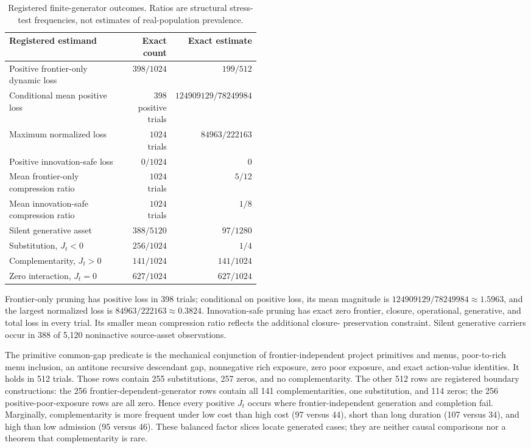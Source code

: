 \begin{table}[htbp]
  \centering
  \small
  \begin{tabular}{@{}p{0.48\linewidth}rr@{}}
    \toprule
    Registered estimand & Exact count & Exact estimate \\
    \midrule
    Positive frontier-only dynamic loss
      & \(398/1024\) & \(199/512\) \\
    Conditional mean positive loss
      & \(398\) positive trials & \(124909129/78249984\) \\
    Maximum normalized loss
      & \(1024\) trials & \(84963/222163\) \\
    Positive innovation-safe loss
      & \(0/1024\) & \(0\) \\
    Mean frontier-only compression ratio
      & \(1024\) trials & \(5/12\) \\
    Mean innovation-safe compression ratio
      & \(1024\) trials & \(1/8\) \\
    Silent generative asset
      & \(388/5120\) & \(97/1280\) \\
    Substitution, \(J_t<0\)
      & \(256/1024\) & \(1/4\) \\
    Complementarity, \(J_t>0\)
      & \(141/1024\) & \(141/1024\) \\
    Zero interaction, \(J_t=0\)
      & \(627/1024\) & \(627/1024\) \\
    \bottomrule
  \end{tabular}
  \caption{Registered finite-generator outcomes.  Ratios are structural
  stress-test frequencies, not estimates of real-population prevalence.}
  \label{tab:supp-randomized-library-v2}
\end{table}

Frontier-only pruning has positive loss in 398 trials; conditional on positive
loss, its mean magnitude is
\(124909129/78249984\approx1.5963\), and the largest normalized loss is
\(84963/222163\approx0.3824\).  Innovation-safe pruning has exact zero
frontier, closure, operational, generative, and total loss in every trial.
Its smaller mean compression ratio reflects the additional closure-
preservation constraint.  Silent generative carriers occur in 388 of 5,120
noninactive source-asset observations.

The primitive common-gap predicate is the mechanical conjunction of
frontier-independent project primitives and menus, poor-to-rich menu
inclusion, an antitone recursive descendant gap, nonnegative rich exposure,
zero poor exposure, and exact action-value identities.  It holds in 512
trials.  Those rows contain 255 substitutions, 257 zeros, and no
complementarity.  The other 512 rows are registered boundary constructions:
the 256 frontier-dependent-generator rows contain all 141 complementarities,
one substitution, and 114 zeros; the 256 positive-poor-exposure rows are all
zero.  Hence every positive \(J_t\) occurs where frontier-independent
generation and completion fail.  Marginally, complementarity is more frequent
under low cost than high cost (97 versus 44), short than long duration (107
versus 34), and high than low admission (95 versus 46).  These balanced factor
slices locate generated cases; they are neither causal comparisons nor a
theorem that complementarity is rare.

